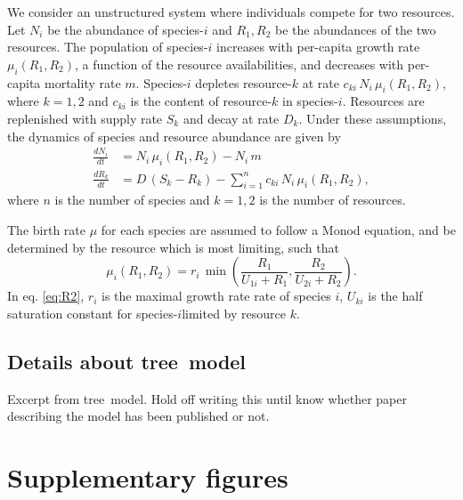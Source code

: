 \documentclass[a4paper,11pt]{article}
\newcommand{\TREE}{{\sc tree}}
\begin{document}
We consider an unstructured system where individuals compete for two
resources. Let $N_i$ be the abundance of species-$i$ and $R_1, R_2$ be the
abundances of the two resources. The population of species-$i$ increases with
per-capita
growth rate $\mu_i(R_1,R_2)$, a function of the resource availabilities, and
decreases with per-capita mortality rate $m$. Species-$i$ depletes resource-$k$
at rate $c_{ki} \,  N_i \, \mu_i(R_1,R_2)$, where $k = 1, 2$ and $c_{ki}$ is
the content of resource-$k$ in species-$i$. Resources
are replenished
with supply rate $S_k$ and decay at rate $D_k$. Under these assumptions, the
dynamics of species and resource abundance are given by
\begin{subequations}
  \begin{align}
\label{eq:R1}
\frac{dN_i}{dt} &= N_i \, \mu_i(R_1,R_2) - N_i \, m \\
\frac{dR_k}{dt} &= D \, (S_k- R_k) - \sum_{i=1}^{n}{c_{ki} \, N_i \,
  \mu_i(R_1, R_2)},
\end{align}
\end{subequations}
where $n$ is the number of species and $k=1,2$ is the number of resources.

The birth rate $\mu$ for each species are assumed to follow a Monod equation,
and be determined by the resource which is most limiting, such that
\begin{equation}
\label{eq:R2}
\mu_i(R_1, R_2) = r_i \, \min \left(\frac{R_1}{U_{1i} + R_1},
                                    \frac{R_2}{U_{2i} + R_2} \right).
\end{equation}
In eq. \ref{eq:R2}, $r_i$ is the maximal growth rate rate of species $i$, $U_
{ki}$ is the half saturation constant for species-$i$limited by resource $k$.

\subsection{Details about \TREE\ model}\label{TREE}

Excerpt from  \TREE\ model. Hold off writing this until know whether paper describing
the model has been published or not.

\section{Supplementary figures}
\end{document}
